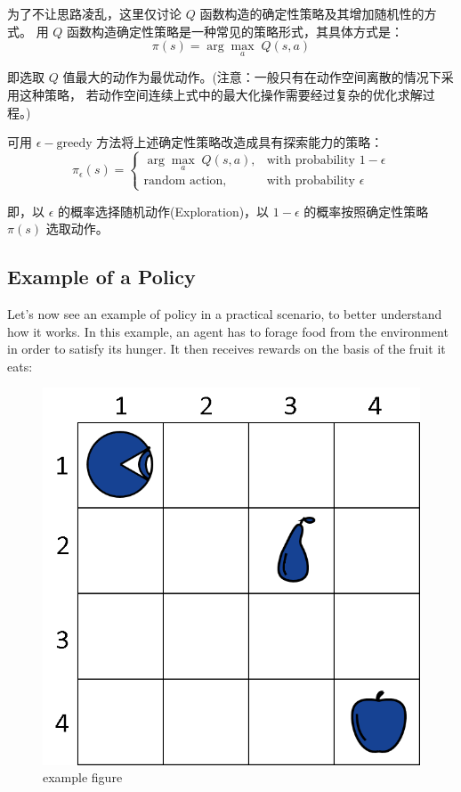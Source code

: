 为了不让思路凌乱，这里仅讨论 $Q$ 函数构造的确定性策略及其增加随机性的方式。
用 $Q$ 函数构造确定性策略是一种常见的策略形式，其具体方式是：
$$
\pi(s)= \arg \underset{a}{\max}\; Q(s, a)
$$

即选取 $Q$ 值最大的动作为最优动作。(注意：一般只有在动作空间离散的情况下采用这种策略，
若动作空间连续上式中的最大化操作需要经过复杂的优化求解过程。)

可用 $\epsilon-\text{greedy}$ 方法将上述确定性策略改造成具有探索能力的策略：
$$
\pi_\epsilon(s)=\begin{cases}
\arg\max_a\; Q(s,a), &\text{with probability } 1 - \epsilon \\
\text{random action}, &\text{with probability } \epsilon
\end{cases}
$$

即，以 $\epsilon$ 的概率选择随机动作(Exploration)，以 $1 - \epsilon$ 
的概率按照确定性策略 $\pi(s)$ 选取动作。


\subsection{Example of a Policy}

Let's now see an example of policy in a practical scenario, 
to better understand how it works. In this example, an agent 
has to forage food from the environment in order to satisfy 
its hunger. It then receives rewards on the basis of the 
fruit it eats:

\begin{figure}[!htb]

\centering
\includegraphics[scale=0.5]{pix/example1.png}
\caption{example figure}
\end{figure}

